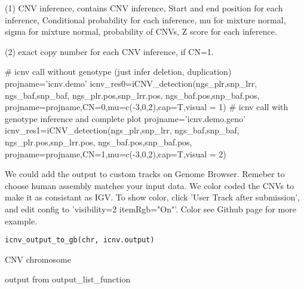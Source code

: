 \documentclass[a4paper]{book}
\begin{document}
%
\begin{Value}
(1) CNV inference, contains CNV inference, Start and end position for each inference, Conditional probability for each inference, mu for mixture normal, sigma for mixture normal, probability of CNVs, Z score for each inference.

(2) exact copy number for each CNV inference, if CN=1.
\end{Value}
%
\begin{Examples}
\begin{ExampleCode}
# icnv call without genotype (just infer deletion, duplication)
projname='icnv.demo'
icnv_res0=iCNV_detection(ngs_plr,snp_lrr,
                         ngs_baf,snp_baf,
                         ngs_plr.pos,snp_lrr.pos,
                         ngs_baf.pos,snp_baf.pos,
                         projname=projname,CN=0,mu=c(-3,0,2),cap=T,visual = 1)
# icnv call with genotype inference and complete plot
projname='icnv.demo.geno'
icnv_res1=iCNV_detection(ngs_plr,snp_lrr,
                         ngs_baf,snp_baf,
                         ngs_plr.pos,snp_lrr.pos,
                         ngs_baf.pos,snp_baf.pos,
                         projname=projname,CN=1,mu=c(-3,0,2),cap=T,visual = 2)
\end{ExampleCode}
\end{Examples}
%
\begin{Description}\relax
We could add the output to custom tracks on Genome Browser. Remeber to choose human assembly matches your input data.
We color coded the CNVs to make it as consistant as IGV. To show color, click 'User Track after submission', and edit
config to 'visibility=2 itemRgb="On"'. Color see Github page for more example.
\end{Description}
%
\begin{Usage}
\begin{verbatim}
icnv_output_to_gb(chr, icnv.output)
\end{verbatim}
\end{Usage}
%
\begin{Arguments}
\begin{ldescription}
\item[\code{chr}] CNV chromosome

\item[\code{icnv.output}] output from output\_list\_function
\end{ldescription}
\end{Arguments}
\end{document}
